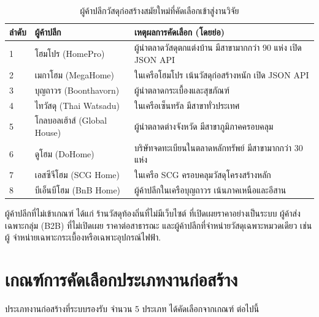 \begin{table}[H]
\centering
\caption{ผู้ค้าปลีกวัสดุก่อสร้างสมัยใหม่ที่คัดเลือกเข้าสู่งานวิจัย}
\label{tab:retailer-selection}
\small
\begin{tabularx}{\textwidth}{l l X}
\toprule
\textbf{ลำดับ} & \textbf{ผู้ค้าปลีก} & \textbf{เหตุผลการคัดเลือก (โดยย่อ)} \\
\midrule
1 & โฮมโปร (HomePro) & ผู้นำตลาดวัสดุตกแต่งบ้าน มีสาขามากกว่า 90 แห่ง เปิด JSON API \\
2 & เมกาโฮม (MegaHome) & ในเครือโฮมโปร เน้นวัสดุก่อสร้างหนัก เปิด JSON API \\
3 & บุญถาวร (Boonthavorn) & ผู้นำตลาดกระเบื้องและสุขภัณฑ์ \\
4 & ไทวัสดุ (Thai Watsadu) & ในเครือเซ็นทรัล มีสาขาทั่วประเทศ \\
5 & โกลบอลเฮ้าส์ (Global House) & ผู้นำตลาดต่างจังหวัด มีสาขาภูมิภาคครอบคลุม \\
6 & ดูโฮม (DoHome) & บริษัทจดทะเบียนในตลาดหลักทรัพย์ มีสาขามากกว่า 30 แห่ง \\
7 & เอสซีจีโฮม (SCG Home) & ในเครือ SCG ครอบคลุมวัสดุโครงสร้างหลัก \\
8 & บีเอ็นบีโฮม (BnB Home) & ผู้ค้าปลีกในเครือบุญถาวร เน้นภาคเหนือและอีสาน \\
\bottomrule
\end{tabularx}
\end{table}

ผู้ค้าปลีกที่ไม่เข้าเกณฑ์ ได้แก่ ร้านวัสดุท้องถิ่นที่ไม่มีเว็บไซต์
ที่เปิดเผยราคาอย่างเป็นระบบ ผู้ค้าส่งเฉพาะกลุ่ม (B2B) ที่ไม่เปิดเผย
ราคาต่อสาธารณะ และผู้ค้าปลีกที่จำหน่ายวัสดุเฉพาะหมวดเดียว เช่น ผู้
จำหน่ายเฉพาะกระเบื้องหรือเฉพาะอุปกรณ์ไฟฟ้า.

\section{เกณฑ์การคัดเลือกประเภทงานก่อสร้าง}
\label{sec:work-type-selection}

ประเภทงานก่อสร้างที่ระบบรองรับ จำนวน 5 ประเภท ได้คัดเลือกจากเกณฑ์
ต่อไปนี้

